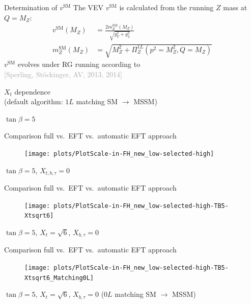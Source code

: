 \documentclass[hyperref={pdfpagelabels=false},ngerman]{beamer}
\newcommand{\bigcite}[1]{\textcolor{darkgray}{[#1]}}
\newcommand{\SM}{\ensuremath{\text{SM}}}
\begin{document}
\begin{frame}[noframenumbering]{Determination of $v^\SM$}
  The VEV $v^\SM$ is calculated from the running $Z$ mass at $Q = M_Z$:
  \begin{align*}
    v^{\SM}(M_Z) &= \frac{2 m_Z^{\SM}(M_Z)}{\sqrt{g_Y^2 + g_2^2}} \\
    m_Z^{\SM}(M_Z) &= \sqrt{M_Z^2 + \Pi_Z^{1L}(p^2=M_Z^2,Q=M_Z)}
  \end{align*}
  $v^{\SM}$ evolves under RG running according to\\\bigcite{Sperling,
    Stöckinger, AV, 2013, 2014}
\end{frame}


\begin{frame}[noframenumbering]
  \begin{center}
    {\Large $X_t$ dependence}\\[1em]
    (default algorithm: $1L$ matching SM $\rightarrow$ MSSM)
  \end{center}
\end{frame}

\begin{frame}[noframenumbering]
  \begin{center}
    $\tan\beta = 5$
  \end{center}
\end{frame}

\begin{frame}[noframenumbering]{Comparison full vs.\ EFT vs.\ automatic EFT approach}
  \begin{figure}
    \centering
    \texttt{[image: plots/PlotScale-in-FH\_new\_low-selected-high]}
  \end{figure}
  $\tan\beta = 5$, $X_{t,b,\tau} = 0$
\end{frame}

\begin{frame}[noframenumbering]{Comparison full vs.\ EFT vs.\ automatic EFT approach}
  \begin{figure}
    \centering
    \texttt{[image: plots/PlotScale-in-FH\_new\_low-selected-high-TB5-Xtsqrt6]}
  \end{figure}
  $\tan\beta = 5$, $X_{t} = \sqrt{6}$, $X_{b,\tau} = 0$
\end{frame}

\begin{frame}[noframenumbering]{Comparison full vs.\ EFT vs.\ automatic EFT approach}
  \begin{figure}
    \centering
    \texttt{[image: plots/PlotScale-in-FH\_new\_low-selected-high-TB5-Xtsqrt6\_Matching0L]}
  \end{figure}
  $\tan\beta = 5$, $X_{t} = \sqrt{6}$, $X_{b,\tau} = 0$ ($0L$ matching SM $\rightarrow$ MSSM)
\end{frame}
\end{document}
